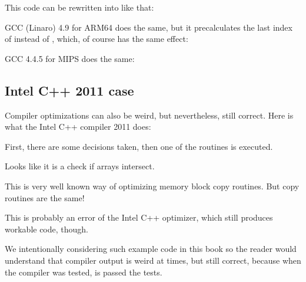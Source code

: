 This code can be rewritten into \CCpp like that:



GCC (Linaro) 4.9 for ARM64 does the same, but it precalculates the last index of  
instead of , which, of course has the same effect:




GCC 4.4.5 for MIPS does the same:



\subsection{Intel C++ 2011 case}
\myindex{\CompilerAnomaly}
\label{loops_iterators_loop_anomaly}

Compiler optimizations can also be weird, but nevertheless, still correct.
Here is what the Intel C++ compiler 2011 does:



First, there are some decisions taken, then one of the routines is executed.

Looks like it is a check if arrays intersect.

This is very well known way of optimizing memory block copy routines.
But copy routines are the same!

This is probably an error of the Intel C++ optimizer, which still produces workable code, though.

We intentionally considering such example code in this book so the reader would understand that compiler output is weird at times,
but still correct, because when the compiler was tested, is passed the tests.
